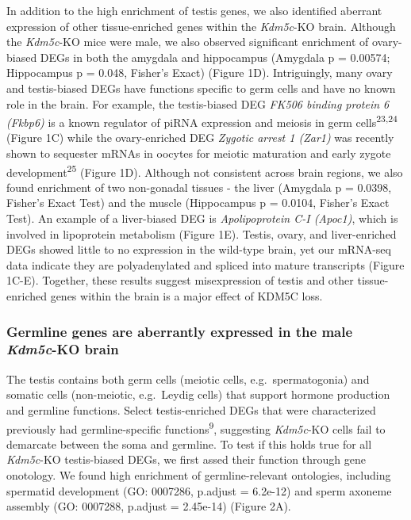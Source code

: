 \documentclass[
]{article}
\begin{document}
In addition to the high enrichment of testis genes, we also identified
aberrant expression of other tissue-enriched genes within the
\emph{Kdm5c}-KO brain. Although the \emph{Kdm5c}-KO mice were male, we
also observed significant enrichment of ovary-biased DEGs in both the
amygdala and hippocampus (Amygdala p = 0.00574; Hippocampus p = 0.048,
Fisher's Exact) (Figure 1D). Intriguingly, many ovary and testis-biased
DEGs have functions specific to germ cells and have no known role in the
brain. For example, the testis-biased DEG \emph{FK506 binding protein 6
(Fkbp6)} is a known regulator of piRNA expression and meiosis in germ
cells\textsuperscript{23,24} (Figure 1C) while the ovary-enriched DEG
\emph{Zygotic arrest 1 (Zar1)} was recently shown to sequester mRNAs in
oocytes for meiotic maturation and early zygote
development\textsuperscript{25} (Figure 1D). Although not consistent
across brain regions, we also found enrichment of two non-gonadal
tissues - the liver (Amygdala p = 0.0398, Fisher's Exact Test) and the
muscle (Hippocampus p = 0.0104, Fisher's Exact Test). An example of a
liver-biased DEG is \emph{Apolipoprotein C-I (Apoc1)}, which is involved
in lipoprotein metabolism (Figure 1E). Testis, ovary, and liver-enriched
DEGs showed little to no expression in the wild-type brain, yet our
mRNA-seq data indicate they are polyadenylated and spliced into mature
transcripts (Figure 1C-E). Together, these results suggest misexpression
of testis and other tissue-enriched genes within the brain is a major
effect of KDM5C loss.

\hypertarget{germline-genes-are-aberrantly-expressed-in-the-male-kdm5c-ko-brain}{%
\subsubsection{\texorpdfstring{Germline genes are aberrantly expressed
in the male \emph{Kdm5c}-KO
brain}{Germline genes are aberrantly expressed in the male Kdm5c-KO brain}}\label{germline-genes-are-aberrantly-expressed-in-the-male-kdm5c-ko-brain}}

The testis contains both germ cells (meiotic cells, e.g.~spermatogonia)
and somatic cells (non-meiotic, e.g.~Leydig cells) that support hormone
production and germline functions. Select testis-enriched DEGs that were
characterized previously had germline-specific
functions\textsuperscript{9}, suggesting \emph{Kdm5c}-KO cells fail to
demarcate between the soma and germline. To test if this holds true for
all \emph{Kdm5c}-KO testis-biased DEGs, we first assed their function
through gene onotology. We found high enrichment of germline-relevant
ontologies, including spermatid development (GO: 0007286, p.adjust =
6.2e-12) and sperm axoneme assembly (GO: 0007288, p.adjust = 2.45e-14)
(Figure 2A).
\end{document}
